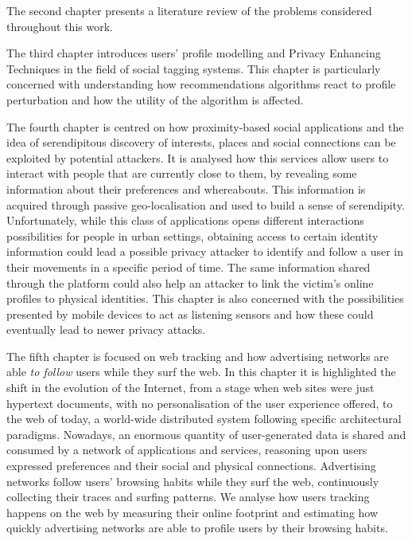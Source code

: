 The second chapter presents a literature review of the problems considered throughout this work.

The third chapter introduces users' profile modelling and Privacy Enhancing Techniques in the field of social tagging systems. This chapter is particularly concerned with understanding how recommendations algorithms react to profile perturbation and how the utility of the algorithm is affected.

The fourth chapter is centred on how proximity-based social applications and the idea of serendipitous discovery of interests, places and social connections can be exploited by potential attackers. It is analysed how this services allow users to interact with people that are currently close to them, by revealing some information about their preferences and whereabouts. This information is acquired through passive geo-localisation and used to build a sense of serendipity. Unfortunately, while this class of applications opens different interactions possibilities for people in urban settings, obtaining access to certain identity information could lead a possible privacy attacker to identify and follow a user in their movements in a specific period of time. The same information shared through the platform could also help an attacker to link the victim’s online profiles to physical identities. This chapter is also concerned with the possibilities presented by mobile devices to act as listening sensors and how these could eventually lead to newer privacy attacks.

The fifth chapter is focused on web tracking and how advertising networks are able \emph{to follow} users while they surf the web. In this chapter it is highlighted the shift in the evolution of the Internet, from a stage when web sites were just hypertext documents, with no personalisation of the user experience offered, to the web of today, a world-wide distributed system following specific architectural paradigms. Nowadays, an enormous quantity of user-generated data is shared and consumed by a network of applications and services, reasoning upon users expressed preferences and their social and physical connections. Advertising networks follow users’ browsing habits while they surf the web, continuously collecting their traces and surfing patterns. We analyse how users tracking happens on the web by measuring their online footprint and estimating how quickly advertising networks are able to profile users by their browsing habits.

